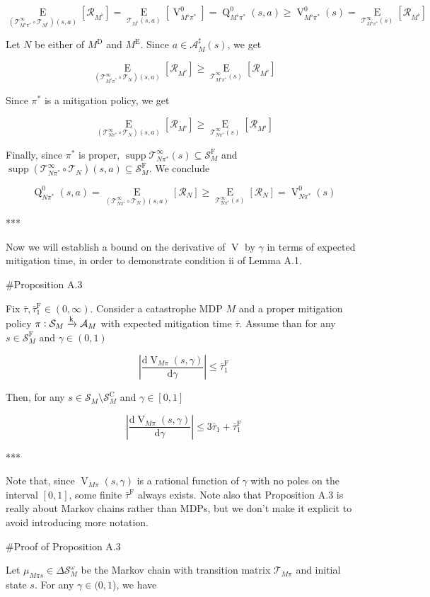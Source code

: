 \documentclass[a4paper]{article}
\DeclareMathOperator{\Supp}{supp}
\newcommand{\AP}[1]{\left(#1\right)}
\newcommand{\AB}[1]{\left[#1\right]}
\newcommand{\Ea}[2]{\underset{#1}{\operatorname{E}}\AB{#2}}
\newcommand{\D}{\mathrm{d}}
\newcommand{\Abs}[1]{\left\vert #1 \right\vert}
\newcommand{\M}{\xrightarrow{\textnormal{k}}}
\newcommand{\A}{\mathcal{A}}
\newcommand{\St}{\mathcal{S}}
\newcommand{\T}{\mathcal{T}}
\newcommand{\R}{\mathcal{R}}
\newcommand{\RMC}{\mathrm{C}}
\newcommand{\RMD}{\mathrm{D}}
\newcommand{\RME}{\mathrm{E}}
\newcommand{\RMF}{\mathrm{F}}
\newcommand{\SF}{\St^{\RMF}}
\newcommand{\SC}{\St^{\RMC}}
\newcommand{\MD}{M^{\RMD}}
\newcommand{\ME}{M^{\RME}}
\newcommand{\TF}{\bar{\tau}^{\RMF}}
\newcommand{\V}{\operatorname{V}}
\newcommand{\Q}{\operatorname{Q}}
\begin{document}
$$\Ea{\AP{\T_{M^\flat\pi^*}^\infty \circ \T_{M^\flat}}(s,a)}{\R_{M^\flat}} = \Ea{\T_{M^\flat}(s,a)}{\V^0_{M^\flat\pi^*}} = \Q_{M^\flat\pi^*}^0(s,a) \geq \V_{M^\flat\pi^*}^0(s) = \Ea{\T_{M^\flat\pi^*}^\infty(s)}{\R_{M^\flat}}$$

Let $N$ be either of $\MD$ and $\ME$. Since $a \in \A_M^\sharp(s)$, we get

$$\Ea{\AP{\T_{M^\flat\pi^*}^\infty \circ \T_{N}}(s,a)}{\R_{M^\flat}} \geq \Ea{\T_{M^\flat\pi^*}^\infty(s)}{\R_{M^\flat}}$$

Since $\pi^*$ is a mitigation policy, we get

$$\Ea{\AP{\T_{N\pi^*}^\infty \circ \T_{N}}(s,a)}{\R_{M^\flat}} \geq \Ea{\T_{N\pi^*}^\infty(s)}{\R_{M^\flat}}$$

Finally, since $\pi^*$ is proper, $\Supp{\T_{N\pi^*}^\infty(s)} \subseteq \SF_M$ and $\Supp{\AP{\T_{N\pi^*}^\infty \circ \T_{N}}(s,a)} \subseteq \SF_M$. We conclude

$$\Q_{N\pi^*}^0(s,a) = \Ea{\AP{\T_{N\pi^*}^\infty \circ \T_{N}}(s,a)}{\R_{N}} \geq \Ea{\T_{N\pi^*}^\infty(s)}{\R_{N}} = \V_{N\pi^*}^0(s)$$

***

Now we will establish a bound on the derivative of $\V$ by $\gamma$ in terms of expected mitigation time, in order to demonstrate condition ii of Lemma A.1.

\#Proposition A.3

Fix $\bar{\tau}, \TF_1 \in (0,\infty)$. Consider a catastrophe MDP $M$ and a proper mitigation policy $\pi: \St_M \M \A_M$ with expected mitigation time $\bar{\tau}$. Assume than for any $s \in \SF_M$ and $\gamma\in(0,1)$

$$\Abs{\frac{\D\V_{M\pi}(s,\gamma)}{\D\gamma}} \leq \TF_1$$

Then, for any $s \in \St_M \setminus \SC_M$ and $\gamma\in[0,1]$

$$\Abs{\frac{\D\V_{M\pi}(s,\gamma)}{\D\gamma}} \leq 3 \bar{\tau}_1 + \TF_1$$

***

Note that, since $\V_{M\pi}(s,\gamma)$ is a rational function of $\gamma$ with no poles on the interval $[0,1]$, some finite $\TF$ always exists. Note also that Proposition A.3 is really about Markov chains rather than MDPs, but we don't make it explicit to avoid introducing more notation.

\#Proof of Proposition A.3

Let $\mu_{M\pi s}\in\Delta\St_M^\omega$ be the Markov chain with transition matrix $\T_{M\pi}$ and initial state $s$. For any $\gamma\in(0,1$), we have
\end{document}
